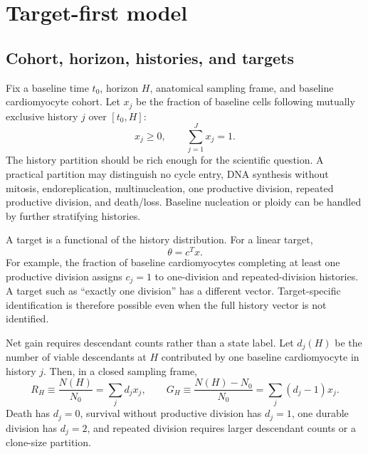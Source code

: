 \documentclass[11pt]{article}
\begin{document}
\section{Target-first model}
\subsection{Cohort, horizon, histories, and targets}
Fix a baseline time $t_0$, horizon $H$, anatomical sampling frame, and baseline cardiomyocyte cohort. Let $x_j$ be the fraction of baseline cells following mutually exclusive history $j$ over $[t_0,H]$:
\begin{equation}
x_j\ge0,\qquad \sum_{j=1}^Jx_j=1.
\end{equation}
The history partition should be rich enough for the scientific question. A practical partition may distinguish no cycle entry, DNA synthesis without mitosis, endoreplication, multinucleation, one productive division, repeated productive division, and death/loss. Baseline nucleation or ploidy can be handled by further stratifying histories.

A target is a functional of the history distribution. For a linear target,
\begin{equation}
\theta=c^Tx.
\end{equation}
For example, the fraction of baseline cardiomyocytes completing at least one productive division assigns $c_j=1$ to one-division and repeated-division histories. A target such as ``exactly one division'' has a different vector. Target-specific identification is therefore possible even when the full history vector is not identified.

Net gain requires descendant counts rather than a state label. Let $d_j(H)$ be the number of viable descendants at $H$ contributed by one baseline cardiomyocyte in history $j$. Then, in a closed sampling frame,
\begin{equation}
R_H\equiv \frac{N(H)}{N_0}=\sum_jd_jx_j,\qquad
G_H\equiv\frac{N(H)-N_0}{N_0}=\sum_j(d_j-1)x_j.
\label{eq:gain}
\end{equation}
Death has $d_j=0$, survival without productive division has $d_j=1$, one durable division has $d_j=2$, and repeated division requires larger descendant counts or a clone-size partition.
\end{document}
